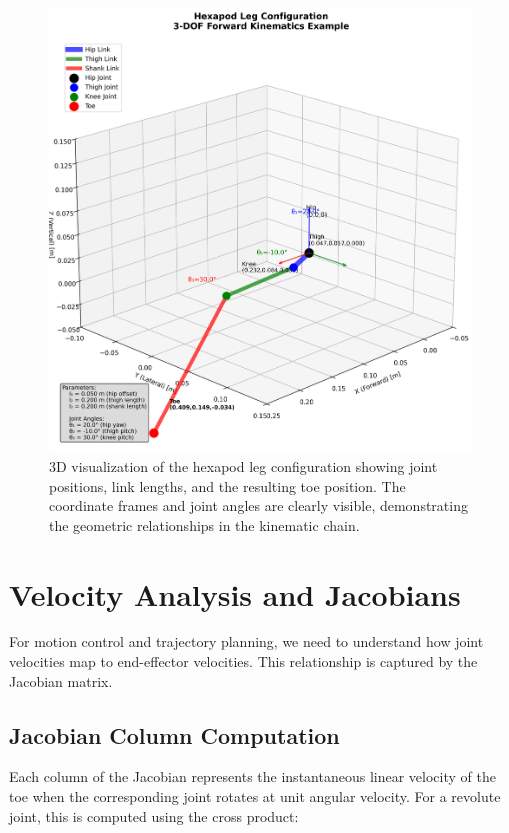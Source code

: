 \documentclass[11pt]{article}
\begin{document}
\begin{figure}[H]
    \centering
    \includegraphics[width=\textwidth]{illustrations/leg_configuration-py.png}
    \caption{3D visualization of the hexapod leg configuration showing joint positions, link lengths, and the resulting toe position. The coordinate frames and joint angles are clearly visible, demonstrating the geometric relationships in the kinematic chain.}
    \label{fig:leg_config}
\end{figure}

\section{Velocity Analysis and Jacobians}

For motion control and trajectory planning, we need to understand how joint velocities map to end-effector velocities. This relationship is captured by the Jacobian matrix.

\subsection{Jacobian Column Computation}

Each column of the Jacobian represents the instantaneous linear velocity of the toe when the corresponding joint rotates at unit angular velocity. For a revolute joint, this is computed using the cross product:
\end{document}
